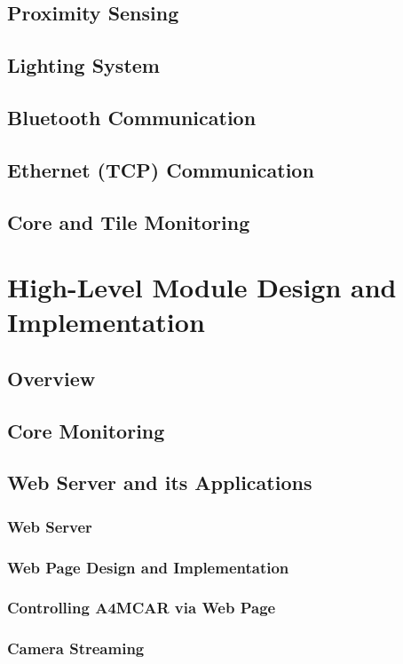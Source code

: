 \subsection{Proximity Sensing}
\subsection{Lighting System}
\subsection{Bluetooth Communication}
\subsection{Ethernet (TCP) Communication}
\subsection{Core and Tile Monitoring}
\section{High-Level Module Design and Implementation}
\subsection{Overview}
\subsection{Core Monitoring}
\subsection{Web Server and its Applications}
\subsubsection{Web Server}
\subsubsection{Web Page Design and Implementation}  %
\subsubsection{Controlling A4MCAR via Web Page}
\subsubsection{Camera Streaming}
